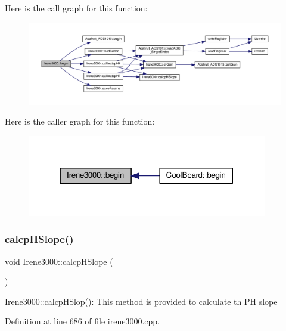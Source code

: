 Here is the call graph for this function\+:\nopagebreak
\begin{figure}[H]
\begin{center}
\leavevmode
\includegraphics[width=350pt]{d6/d03/class_irene3000_ad5891806c500ae1007afe52b9e304c2b_cgraph}
\end{center}
\end{figure}
Here is the caller graph for this function\+:\nopagebreak
\begin{figure}[H]
\begin{center}
\leavevmode
\includegraphics[width=297pt]{d6/d03/class_irene3000_ad5891806c500ae1007afe52b9e304c2b_icgraph}
\end{center}
\end{figure}
\mbox{\label{class_irene3000_a81f6a79e546679692053f7ac1af49613}} 
\subsubsection{\texorpdfstring{calcp\+H\+Slope()}{calcpHSlope()}}
{\footnotesize\ttfamily void Irene3000\+::calcp\+H\+Slope (\begin{DoxyParamCaption}{ }\end{DoxyParamCaption})}

Irene3000\+::calcp\+H\+Slop()\+: This method is provided to calculate th PH slope 

Definition at line 686 of file irene3000.\+cpp.


